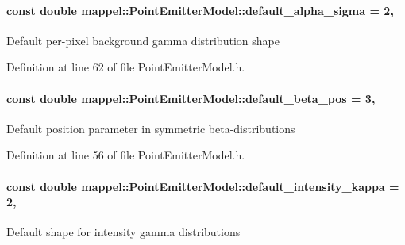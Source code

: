 \paragraph[{\texorpdfstring{default\+\_\+alpha\+\_\+sigma}{default_alpha_sigma}}]{\setlength{\rightskip}{0pt plus 5cm}const double mappel\+::\+Point\+Emitter\+Model\+::default\+\_\+alpha\+\_\+sigma = 2\hspace{0.3cm}{\ttfamily [static]}, {\ttfamily [inherited]}}\hypertarget{classmappel_1_1PointEmitterModel_a0d9f2c5438940f329e75708987e8b343}{}\label{classmappel_1_1PointEmitterModel_a0d9f2c5438940f329e75708987e8b343}
Default per-\/pixel background gamma distribution shape 

Definition at line 62 of file Point\+Emitter\+Model.\+h.

\paragraph[{\texorpdfstring{default\+\_\+beta\+\_\+pos}{default_beta_pos}}]{\setlength{\rightskip}{0pt plus 5cm}const double mappel\+::\+Point\+Emitter\+Model\+::default\+\_\+beta\+\_\+pos = 3\hspace{0.3cm}{\ttfamily [static]}, {\ttfamily [inherited]}}\hypertarget{classmappel_1_1PointEmitterModel_a9b64c3b4b97ac2805340c0779c71398c}{}\label{classmappel_1_1PointEmitterModel_a9b64c3b4b97ac2805340c0779c71398c}
Default position parameter in symmetric beta-\/distributions 

Definition at line 56 of file Point\+Emitter\+Model.\+h.

\paragraph[{\texorpdfstring{default\+\_\+intensity\+\_\+kappa}{default_intensity_kappa}}]{\setlength{\rightskip}{0pt plus 5cm}const double mappel\+::\+Point\+Emitter\+Model\+::default\+\_\+intensity\+\_\+kappa = 2\hspace{0.3cm}{\ttfamily [static]}, {\ttfamily [inherited]}}\hypertarget{classmappel_1_1PointEmitterModel_ad1f21ed3be543deed3c78a0494cb2984}{}\label{classmappel_1_1PointEmitterModel_ad1f21ed3be543deed3c78a0494cb2984}
Default shape for intensity gamma distributions 

